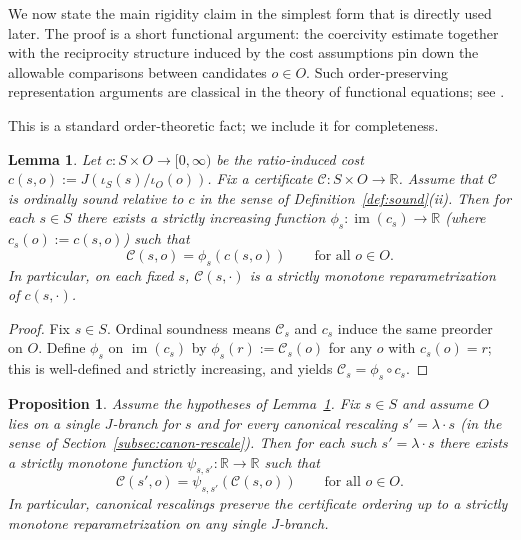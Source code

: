 \documentclass[11pt,reqno]{amsart}
\newtheorem{proposition}[theorem]{Proposition}
\newtheorem{lemma}[theorem]{Lemma}
\theoremstyle{definition}
\theoremstyle{remark}
\newcommand{\R}{\mathbb{R}}
\newcommand{\1}{\mathbf{1}}
\begin{document}
We now state the main rigidity claim in the simplest form that is directly used
later. The proof is a short functional argument: the coercivity estimate together with the reciprocity structure induced by the cost assumptions pin down the allowable comparisons between candidates $o\in O$.
Such order-preserving representation arguments are classical in the theory of functional equations; see \cite{aczel1966}.


\noindent This is a standard order-theoretic fact; we include it for completeness.
\begin{lemma}\label{lem:forced-factor}
Let $c:S\times O\to[0,\infty)$ be the ratio-induced cost $c(s,o):=J(\iota_S(s)/\iota_O(o))$.
Fix a certificate $\mathcal{C}:S\times O\to\R$.
Assume that $\mathcal{C}$ is \emph{ordinally sound} relative to $c$ in the sense of
Definition~\ref{def:sound}(ii).
Then for each $s\in S$ there exists a strictly increasing function
$\phi_s:\operatorname{im}(c_s)\to\R$ (where $c_s(o):=c(s,o)$) such that
\[
\mathcal{C}(s,o)=\phi_s(c(s,o))\qquad\text{for all }o\in O.
\]
In particular, on each fixed $s$, $\mathcal{C}(s,\cdot)$ is a strictly monotone reparametrization of $c(s,\cdot)$.
\end{lemma}

\begin{proof}
Fix $s\in S$. Ordinal soundness means $\mathcal{C}_s$ and $c_s$ induce the same preorder on $O$.
Define $\phi_s$ on $\operatorname{im}(c_s)$ by $\phi_s(r):=\mathcal{C}_s(o)$ for any $o$ with $c_s(o)=r$; this is well-defined and strictly increasing, and yields $\mathcal{C}_s=\phi_s\circ c_s$.
\end{proof}


\begin{proposition}\label{prop:rescale-stability}
Assume the hypotheses of Lemma~\ref{lem:forced-factor}.
Fix $s\in S$ and assume $O$ lies on a single $J$-branch for $s$ and for every canonical rescaling $s'=\lambda\cdot s$
(in the sense of Section~\ref{subsec:canon-rescale}).
Then for each such $s'=\lambda\cdot s$ there exists a strictly monotone function $\psi_{s,s'}:\R\to\R$ such that
\[
\mathcal{C}(s',o)=\psi_{s,s'}(\mathcal{C}(s,o))\qquad\text{for all }o\in O.
\]
In particular, canonical rescalings preserve the certificate ordering up to a strictly monotone reparametrization on any single $J$-branch.
\end{proposition}
\end{document}

